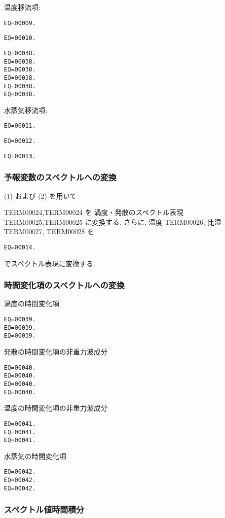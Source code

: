 温度移流項:
\begin{verbatim}
EQ=00009.
\end{verbatim}
\begin{verbatim}
EQ=00010.
\end{verbatim}
%
\begin{verbatim}
EQ=00038.
EQ=00038.
EQ=00038.
EQ=00038.
EQ=00038.
EQ=00038.
\end{verbatim}

水蒸気移流項:
\begin{verbatim}
EQ=00011.
\end{verbatim}
\begin{verbatim}
EQ=00012.
\end{verbatim}
%
\begin{verbatim}
EQ=00013.
\end{verbatim}

\subsubsection{予報変数のスペクトルへの変換}

(1) および
(2) を用いて

TERM00024,TERM00024 を
渦度・発散のスペクトル表現
TERM00025,TERM00025 に変換する.
さらに,
温度 TERM00026, 比湿 TERM00027, 
TERM00028 を
\begin{verbatim}
EQ=00014.
\end{verbatim}
でスペクトル表現に変換する.

\subsubsection{時間変化項のスペクトルへの変換}

渦度の時間変化項
\begin{verbatim}
EQ=00039.
EQ=00039.
EQ=00039.
\end{verbatim}
%
発散の時間変化項の非重力波成分
\begin{verbatim}
EQ=00040.
EQ=00040.
EQ=00040.
EQ=00040.
\end{verbatim}
%
温度の時間変化項の非重力波成分
\begin{verbatim}
EQ=00041.
EQ=00041.
EQ=00041.
\end{verbatim}
%
水蒸気の時間変化項
\begin{verbatim}
EQ=00042.
EQ=00042.
EQ=00042.
\end{verbatim}

\subsubsection{スペクトル値時間積分}


